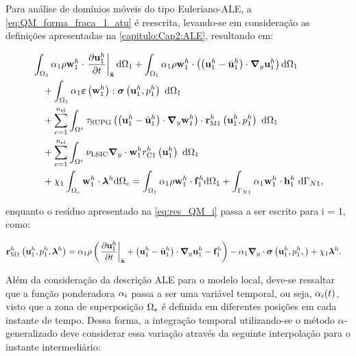 Para análise de domínios móveis do tipo Euleriano-ALE, a \autoref{eq:QM_forma_fraca_1_atu} é reescrita, levando-se em consideração as definições apresentadas na \autoref{capitulo:Cap2:ALE}, resultando em:

\begin{align}
	\begin{split}
		&\int_{\localModel} \arlequinWFLocal \density \wlocalh \cdot \left. \frac{\partial\ulocalh}{\partial t} \right|_{\posALE} \deriv \localModel +
		\int_{\localModel} \arlequinWFLocal \density \wlocalh \cdot  \left(\left(\ulocalh - \velocityALEh_{1}\right) \cdot \gradient \ulocalh\right) \deriv \localModel  \\ 
		&\quad+	
		\int_{\localModel} \arlequinWFLocal \straintensor \left(\wlocalh\right) : \stressTensor \left(\ulocalh,\plocalh\right)\ \deriv \localModel 
		\\ 
		&\quad+ \sum_{e=1}^{\nel} \int_{\domainE} \SUPG  \left( \left(\ulocalh - \velocityALEh_{1}\right) \cdot \gradient \wlocalh\right) \cdot \resMomLocal\left(\ulocalh,\plocalh \right)\  \deriv \localModel \\ 
		&\quad+\sum_{e=1}^{\nel} \int_{\domainE} \LSIC \divergence \cdot \wlocalh \resPreLocal
		\left(\ulocalh\right)\  \deriv \localModel \\
		&\quad+  \chi_{1} \int_{\gluingZone} \wlocalh \cdot \lagrangeMultiplierh \deriv \gluingZone  = \int_{\localModel} \arlequinWFLocal \density \wlocalh \cdot  \localsbodyforceh \deriv \localModel + \int_{\localBoundaryN} \arlequinWFLocal \wlocalh \cdot \localSurfaceLoadh\ \deriv \localBoundaryN,
		\label{eq:eq:QM_forma_fraca_1_ALE}
	\end{split}
\end{align}

\noindent enquanto o resíduo apresentado na \autoref{eq:res_QM_i} passa a ser escrito para i = 1, como:

\begin{align}
	\mathbf{r}_{\mathrm{M1}}^{h} \left(\mathbf{u}_1^h,p_1^h,\boldsymbol{\lambda}^h \right)&=\alpha_1 \rho\left(\left. \frac{\partial\mathbf{u}_1^h}{\partial t} \right|_{\bar{\mathbf{x}}}+ \left(\mathbf{u}_1^h - \bar{\mathbf{u}}^h_{1}\right) \cdot \boldsymbol{\nabla}_y \mathbf{u}_1^h  - \mathbf{f}_1^h\right) - \alpha_1 \boldsymbol{\nabla}_y \cdot \boldsymbol{\sigma}\left(\mathbf{u}_1^h,p_1^h,\right)+ \chi_{1} \boldsymbol{\lambda}^h \label{eq:res_QM_ALE}.
\end{align}

Além da consideração da descrição ALE para o modelo local, deve-se ressaltar que a função ponderadora $\alpha_i$ passa a ser uma variável temporal, ou seja, $\alpha_i(t)$, visto que a zona de superposição $\Omega_s$ é definida em diferentes posições em cada instante de tempo. Dessa forma, a integração temporal utilizando-se o método $\alpha$-generalizado deve considerar essa variação através da seguinte interpolação para o instante intermediário:

